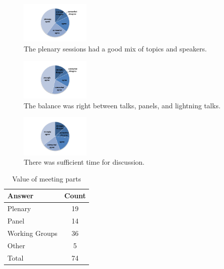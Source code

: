 \begin{figure}[h!]
\includegraphics[width=0.3\textwidth]{figures/SurveyFig1rev}
\caption{The plenary sessions had a good mix of topics and speakers.
\label{fig:SFig1}}
\end{figure}
\begin{figure}[h!]
\includegraphics[width=0.3\textwidth]{figures/SurveyFig2rev}
\caption{The balance was right between talks, panels, and lightning talks.
\label{fig:SFig2}}
\end{figure}
\begin{figure}[h!]
\includegraphics[width=0.3\textwidth]{figures/SurveyFig3rev}
\caption{There was sufficient time for discussion.
\label{fig:SFig3}}
\end{figure}




\begin{table}[h!]
\centering
\caption{Value of meeting parts}
\label{tab:survey_parts}
\begin{tabular}{|l|c|}
\hline
{\bf Answer} &
{\bf Count} \\ \hline
Plenary &
19 \\
Panel &
14 \\
Working Groups &
36 \\
Other &
5 \\
Total &
74 \\
\hline
\end{tabular}
\end{table}

